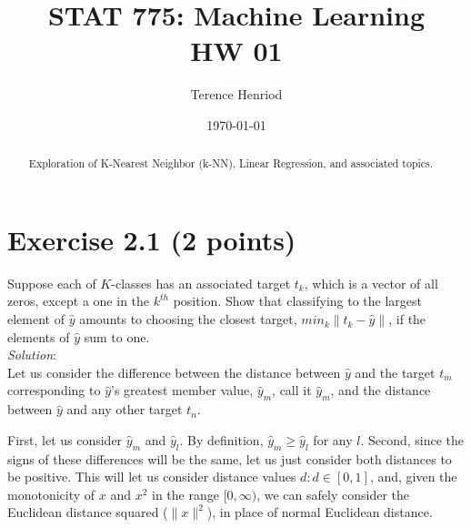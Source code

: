 \documentclass{article}
\title{STAT 775: Machine Learning \\ HW 01}
\author{Terence Henriod}
\date{\today}
\begin{document}
\clearpage            %
\maketitle            %
\thispagestyle{empty} %

\begin{abstract}
Exploration of K-Nearest Neighbor (k-NN), Linear Regression, and associated topics.
\end{abstract}

\newpage
\section{Exercise 2.1 (2 points)}
Suppose each of $K$-classes has an associated target $t_{k}$, which is a vector of all zeros, except a one in the $k^{th}$ position. Show that classifying to the largest element of $\hat{y}$ amounts to choosing the closest target, $min_{k} \|t_{k} - \hat{y}\|$, if the elements of $\hat{y}$ sum to one.\\

\textit{Solution}:\\
Let us consider the difference between the distance between $\hat{y}$ and the target $t_{m}$ corresponding to $\hat{y}$'s greatest member value, $\hat{y}_{m}$, call it $\hat{y}_{m}$, and the distance between $\hat{y}$ and any other target $t_{n}$.

First, let us consider $\hat{y}_{m}$ and $\hat{y}_{l}$. By definition, $\hat{y}_{m} \ge \hat{y}_{l}$ for any $l$.
Second, since the signs of these differences will be the same, let us just consider both distances to be positive. This will let us consider distance values ${d : d \in [0, 1]}$, and, given the monotonicity of $x$ and $x^{2}$ in the range $[0, \infty)$, we can safely consider the Euclidean distance squared ($\|x\|^{2}$), in place of normal Euclidean distance. 
\end{document}
